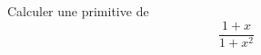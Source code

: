 Calculer une primitive de 
\begin{displaymath}
 \frac{1+x}{1+x^2}
\end{displaymath}
\bigskip \bigskip